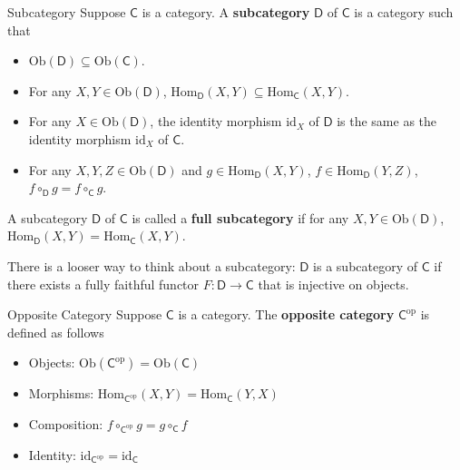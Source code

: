 \begin{definition}{Subcategory}{}
    Suppose $\mathsf{C}$ is a category. A \textbf{subcategory} $\mathsf{D}$ of $\mathsf{C}$ is a category such that
    \begin{itemize}
        \item $\mathrm{Ob}(\mathsf{D})\subseteq \mathrm{Ob}(\mathsf{C})$.
        \item For any $X,Y\in \mathrm{Ob}(\mathsf{D})$, $\mathrm{Hom}_{\mathsf{D}}(X,Y)\subseteq \mathrm{Hom}_{\mathsf{C}}(X,Y)$.
        \item For any $X\in \mathrm{Ob}(\mathsf{D})$, the identity morphism $\mathrm{id}_X$ of $\mathsf{D}$ is the same as the identity morphism $\mathrm{id}_X$ of $\mathsf{C}$.
        \item For any $X,Y,Z\in \mathrm{Ob}(\mathsf{D})$ and  $g\in\mathrm{Hom}_{\mathsf{D}}\left(X,Y\right)$, $f\in\mathrm{Hom}_{\mathsf{D}}\left(Y,Z\right)$, $f\circ_{\mathsf{D}}g=f\circ_{\mathsf{C}}g$.
    \end{itemize}
    A subcategory $\mathsf{D}$ of $\mathsf{C}$ is called a \textbf{full subcategory} if for any $X,Y\in \mathrm{Ob}(\mathsf{D})$, $\mathrm{Hom}_{\mathsf{D}}(X,Y)= \mathrm{Hom}_{\mathsf{C}}(X,Y)$.
\end{definition}

There is a looser way to think about a subcategory: $\mathsf{D}$ is a subcategory of $\mathsf{C}$ if there exists a fully faithful functor $F:\mathsf{D}\to \mathsf{C}$ that is injective on objects.\\


\begin{definition}{Opposite Category}{}
    Suppose $\mathsf{C}$ is a category. The \textbf{opposite category} $\mathsf{C}^{\mathrm{op}}$ is defined as follows
    \begin{itemize}
        \item Objects: $\mathrm{Ob}(\mathsf{C}^{\mathrm{op}})=\mathrm{Ob}(\mathsf{C})$
        \item Morphisms: $\mathrm{Hom}_{\mathsf{C}^{\mathrm{op}}}(X,Y)=\mathrm{Hom}_{\mathsf{C}}(Y,X)$
        \item Composition: $f\circ_{\mathsf{C}^{\mathrm{op}}}g=g\circ_{\mathsf{C}}f$
        \item Identity: $\mathrm{id}_{\mathsf{C}^{\mathrm{op}}}=\mathrm{id}_{\mathsf{C}}$
    \end{itemize}
\end{definition}

